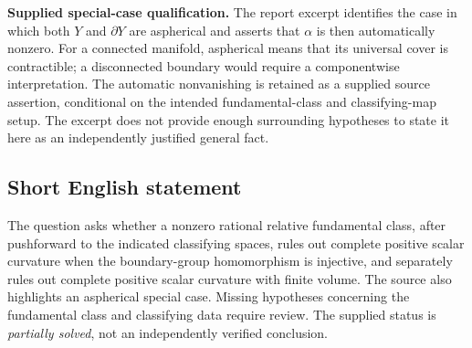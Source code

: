 \documentclass[11pt]{article}
\begin{document}
\textbf{Supplied special-case qualification.} The report excerpt identifies the case in which both \(Y\) and \(\partial Y\) are aspherical and asserts that \(\alpha\) is then automatically nonzero. For a connected manifold, aspherical means that its universal cover is contractible; a disconnected boundary would require a componentwise interpretation. The automatic nonvanishing is retained as a supplied source assertion, conditional on the intended fundamental-class and classifying-map setup. The excerpt does not provide enough surrounding hypotheses to state it here as an independently justified general fact.
\subsection{Short English statement}
The question asks whether a nonzero rational relative fundamental class, after pushforward to the indicated classifying spaces, rules out complete positive scalar curvature when the boundary-group homomorphism is injective, and separately rules out complete positive scalar curvature with finite volume. The source also highlights an aspherical special case. Missing hypotheses concerning the fundamental class and classifying data require review. The supplied status is \emph{partially solved}, not an independently verified conclusion.
\end{document}
